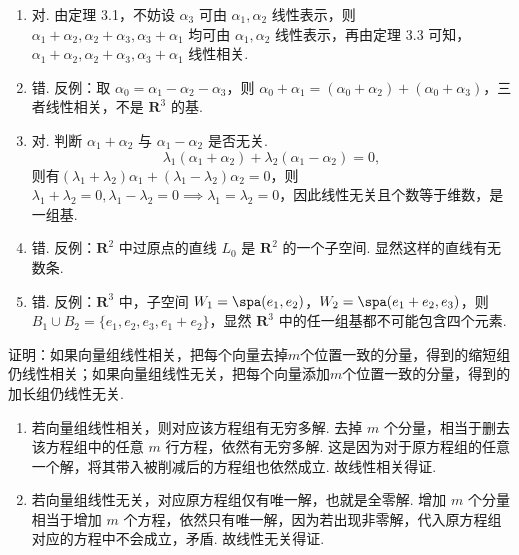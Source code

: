 \begin{exercise}
\begin{exgroup}
\begin{answer}
\begin{enumerate}
                \item 对. 由定理 3.1，不妨设 $\alpha_3$ 可由 $\alpha_1,\alpha_2$ 线性表示，则 $\alpha_1+\alpha_2,\alpha_2+\alpha_3,\alpha_3+\alpha_1$ 均可由 $\alpha_1,\alpha_2$ 线性表示，再由定理 3.3 可知，$\alpha_1+\alpha_2,\alpha_2+\alpha_3,\alpha_3+\alpha_1$ 线性相关.

                \item 错. 反例：取 $\alpha_0=\alpha_1-\alpha_2-\alpha_3$，则 $\alpha_0+\alpha_1=(\alpha_0+\alpha_2)+(\alpha_0+\alpha_3)$，三者线性相关，不是 $\mathbf{R}^3$ 的基.

                \item 对. 判断 $\alpha_1+\alpha_2$ 与 $\alpha_1-\alpha_2$ 是否无关.
                    \[\lambda_1(\alpha_1+\alpha_2)+\lambda_2(\alpha_1-\alpha_2)=0,\]
                    则有$(\lambda_1+\lambda_2)\alpha_1+(\lambda_1-\lambda_2)\alpha_2=0$，则 $\lambda_1+\lambda_2=0,\lambda_1-\lambda_2=0\implies \lambda_1=\lambda_2=0$，因此线性无关且个数等于维数，是一组基.

                \item 错. 反例：$\mathbf{R}^2$ 中过原点的直线 $L_0$ 是 $\mathbf{R}^2$ 的一个子空间. 显然这样的直线有无数条.

                \item 错. 反例：$\mathbf{R}^3$ 中，子空间 $W_1=\spa(e_1,e_2)$，$W_2=\spa(e_1+e_2,e_3)$，则 $B_1\cup B_2=\{e_1,e_2,e_3,e_1+e_2\}$，显然 $\mathbf{R}^3$ 中的任一组基都不可能包含四个元素.
            \end{enumerate}
        \end{answer}

        \item 证明：如果向量组线性相关，把每个向量去掉$m$个位置一致的分量，得到的缩短组仍线性相关；如果向量组线性无关，把每个向量添加$m$个位置一致的分量，得到的加长组仍线性无关.
        \begin{answer}
            \begin{enumerate}
                \item 若向量组线性相关，则对应该方程组有无穷多解. 去掉 $m$ 个分量，相当于删去该方程组中的任意 $m$ 行方程，依然有无穷多解. 这是因为对于原方程组的任意一个解，将其带入被削减后的方程组也依然成立. 故线性相关得证.

                \item 若向量组线性无关，对应原方程组仅有唯一解，也就是全零解. 增加 $m$ 个分量相当于增加 $m$ 个方程，依然只有唯一解，因为若出现非零解，代入原方程组对应的方程中不会成立，矛盾. 故线性无关得证.
            \end{enumerate}
        \end{answer}


\end{exgroup}
\end{exercise}
